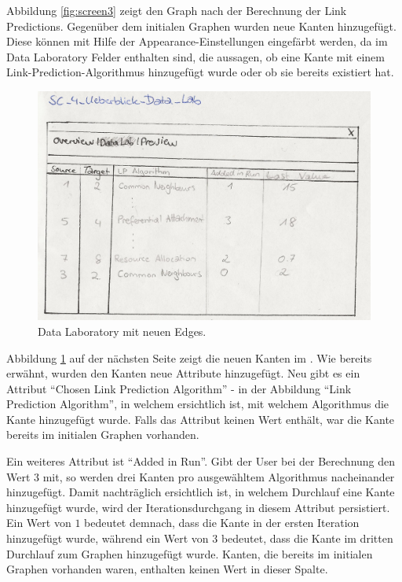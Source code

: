 Abbildung \ref{fig:screen3} zeigt den Graph nach der Berechnung der Link Predictions.
Gegenüber dem initialen Graphen wurden neue Kanten hinzugefügt.
Diese können mit Hilfe der Appearance-Einstellungen eingefärbt werden, da im Data Laboratory Felder enthalten sind, die aussagen, ob eine
Kante mit einem Link-Prediction-Algorithmus hinzugefügt wurde oder ob sie bereits existiert hat.

\begin{figure}
    \includegraphics[width=\linewidth]{resources/SC-4.png}
    \caption{Data Laboratory mit neuen Edges.}
    \label{fig:screen4}
\end{figure}

Abbildung \ref{fig:screen4} auf der nächsten Seite zeigt die neuen Kanten im .
Wie bereits erwähnt, wurden den Kanten neue Attribute hinzugefügt.
Neu gibt es ein Attribut ``Chosen Link Prediction Algorithm'' - in der Abbildung ``Link Prediction Algorithm'', in welchem ersichtlich ist, mit welchem Algorithmus die Kante hinzugefügt wurde.
Falls das Attribut keinen Wert enthält, war die Kante bereits im initialen Graphen vorhanden.

Ein weiteres Attribut ist ``Added in Run''. Gibt der User bei der Berechnung den Wert $3$ mit, so werden drei Kanten pro
ausgewähltem Algorithmus nacheinander hinzugefügt. Damit nachträglich ersichtlich ist, in welchem Durchlauf eine
Kante hinzugefügt wurde, wird der Iterationsdurchgang in diesem Attribut persistiert.
Ein Wert von $1$ bedeutet demnach, dass die Kante in der ersten Iteration hinzugefügt wurde, während ein Wert von $3$ bedeutet, dass die Kante im dritten Durchlauf zum Graphen hinzugefügt wurde.
Kanten, die bereits im initialen Graphen vorhanden waren, enthalten keinen Wert in dieser Spalte.

